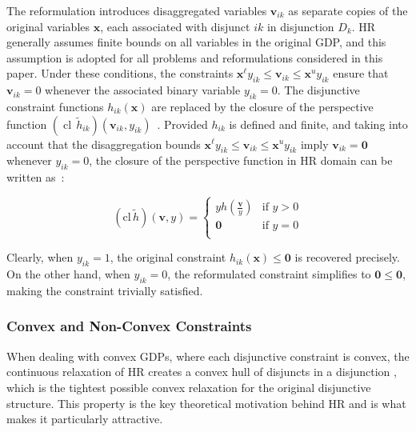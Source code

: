 \documentclass[11pt]{article}
\begin{document}
The reformulation introduces disaggregated variables \(\mathbf{v}_{ik}\) as separate copies of the original variables \(\mathbf{x}\), each associated with disjunct \(ik\) in disjunction \(D_k\). 
HR generally assumes finite bounds on all variables in the original GDP, and this assumption is adopted for all problems and reformulations considered in this paper. Under these conditions, the constraints
\(
\mathbf{x}^{\ell} y_{ik} \leq \mathbf{v}_{ik} \leq \mathbf{x}^{u} y_{ik}
\)
ensure that $\mathbf{v}_{ik} = 0$ whenever the associated binary variable $y_{ik} = 0$.
The disjunctive constraint functions \(h_{ik}(\mathbf{x})\) are replaced by the closure of the perspective function
\(
\left(\operatorname{cl}\,\widetilde{h}_{ik}\right)(\mathbf{v}_{ik},y_{ik})
\)~\cite{ceriaConvexProgrammingDisjunctive1999}.
Provided \(h_{ik}\) is defined and finite, and taking into account that the disaggregation bounds
\(\mathbf{x}^{\ell} y_{ik} \le \mathbf{v}_{ik} \le \mathbf{x}^{u} y_{ik}\)
imply \(\mathbf{v}_{ik}=\mathbf{0}\) whenever \(y_{ik}=0\), the closure of the perspective function in HR domain can be written as~\cite{stubbsBranchandcutMethod011999,grossmannGeneralizedConvexDisjunctive2003,gunlukPerspectiveReformulationApplications2012,furmanComputationallyUsefulAlgebraic2020}:

\begingroup
\begin{equation}
    \left( \text{cl} \, \widetilde{h} \right)(\mathbf{v}, y) = 
\begin{cases} 
    y h\left(\frac{\mathbf{v}}{y}\right) & \text{if } y > 0 \\[5pt]
    \mathbf{0}  & \text{if } y = 0 \\[1pt]
\end{cases}
\label{eq:closure}
\end{equation}
\endgroup


Clearly, when \(y_{ik}=1\), the original constraint \(h_{ik}(\mathbf{x})\leq \mathbf{0}\)  is recovered precisely.
On the other hand, when \(y_{ik}=0\), the reformulated constraint simplifies to \(\mathbf{0}\leq\mathbf{0}\), making the constraint trivially satisfied.




\subsubsection{Convex and Non-Convex Constraints}

When dealing with convex GDPs, where each disjunctive constraint is convex, the continuous relaxation of HR creates a convex hull of disjuncts in a disjunction \cite{grossmannGeneralizedConvexDisjunctive2003}, which is the tightest possible convex relaxation for the original disjunctive structure.
This property is the key theoretical motivation behind HR and is what makes it particularly attractive.
\end{document}
